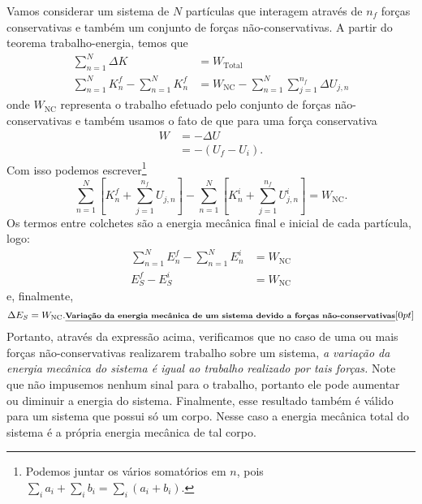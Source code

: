 Vamos considerar um sistema de $N$ partículas que interagem através de $n_f$ forças conservativas e também um conjunto de forças não-conservativas. A partir do teorema trabalho-energia, temos que
\begin{align}
    \sum_{n=1}^N \Delta K &= W_{\textrm{Total}} \\
    \sum_{n=1}^N K_n^f - \sum_{n=1}^N K_n^f &= W_{\textrm{NC}} - \sum_{n = 1}^N \sum_{j = 1}^{n_f} \Delta U_{j,n}
\end{align}
%
onde $W_{\textrm{NC}}$ representa o trabalho efetuado pelo conjunto de forças não-conservativas e também usamos o fato de que para uma força conservativa
\begin{align}
    W &= - \Delta U \\
    &= -(U_f - U_i).
\end{align}
%
Com isso podemos escrever\footnote{Podemos juntar os vários somatórios em $n$, pois $\sum_i a_i + \sum_i b_i = \sum_i(a_i + b_i)$.}
\begin{equation}
    \sum_{n=1}^N[ K_n^f + \sum_{j = 1}^{n_f} U_{j,n}] - \sum_{n=1}^N[K_n^i + \sum_{j = 1}^{n_f} U_{j,n}^i] = W_{\textrm{NC}}.
\end{equation}
%
Os termos entre colchetes são a energia mecânica final e inicial de cada partícula, logo:
\begin{align}
    \sum_{n=1}^N E_n^f - \sum_{n=1}^N E_n^i &= W_{\textrm{NC}} \\
    E_{S}^f - E_S^i &= W_{\textrm{NC}}
\end{align}
%
e, finalmente,
\begin{equation}\label{Eq:TrabalhoNCIgualVarEnergiaMec}
    \Delta E_S = W_{\textrm{NC}}. \relax{\footnotesize\emph{\textbf{Variação da energia mecânica de um sistema devido a forças não-conservativas}}}[0pt]
\end{equation}
%
Portanto, através da expressão acima, verificamos que no caso de uma ou mais forças não-conservativas realizarem trabalho sobre um sistema, \emph{a variação da energia mecânica do sistema é igual ao trabalho realizado por tais forças.} Note que não impusemos nenhum sinal para o trabalho, portanto ele pode aumentar ou diminuir a energia do sistema. Finalmente, esse resultado também é válido para um sistema que possui só um corpo. Nesse caso a energia mecânica total do sistema é a própria energia mecânica de tal corpo. 

